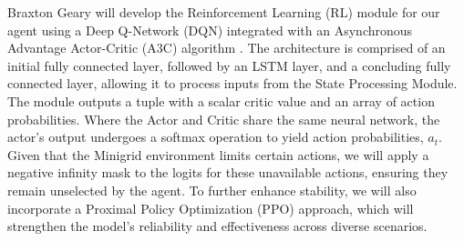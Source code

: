 \documentclass[11pt]{article}
\begin{document}
Braxton Geary will develop the Reinforcement Learning (RL) module for our agent using a Deep Q-Network (DQN) integrated with an 
Asynchronous Advantage Actor-Critic (A3C) algorithm \cite{Mnih2016}. The architecture is comprised of an initial fully connected layer, followed by an LSTM layer, 
and a concluding fully connected layer, allowing it to process inputs from the State Processing Module. The module outputs a tuple with a scalar 
critic value and an array of action probabilities. Where the Actor and Critic share the same neural network, the actor's output undergoes a softmax operation 
to yield action probabilities, \( a_t \). Given that the Minigrid environment limits certain actions, we will apply a negative infinity mask to the logits for 
these unavailable actions, ensuring they remain unselected by the agent. To further enhance stability, we will also incorporate a Proximal Policy Optimization (PPO) 
approach, which will strengthen the model's reliability and effectiveness across diverse scenarios.

% 


\end{document}

